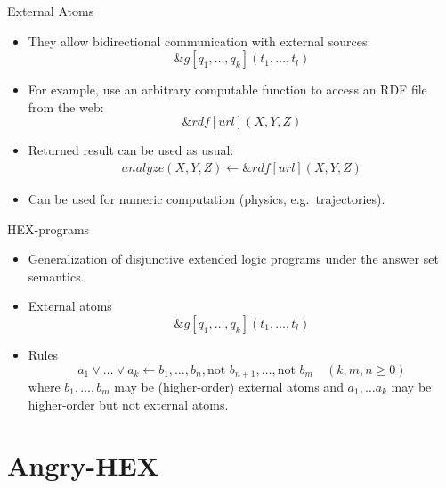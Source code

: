 \documentclass[smaller,dvipsnames]{beamer}
\newcommand{\ah}{Angry-HEX\xspace}
\begin{document}
\begin{frame}{External Atoms}
    \begin{itemize}[<+->]
    	\item They allow bidirectional communication with external sources: \[ \&g[q_1,\dots,q_k](t_1,\dots,t_l) \]
    	\item For example, use an arbitrary computable function to access an RDF file from the web: \[ \&rdf[url](X,Y,Z) \]
    	\item Returned result can be used as usual:
    		\begin{align*}
				analyze(X,Y,Z) \leftarrow \&rdf[url](X,Y,Z)
    		\end{align*}
    	\item Can be used for numeric computation (physics, e.g.~trajectories).
    \end{itemize}
\end{frame}

\begin{frame}{HEX-programs}
    \begin{itemize}[<+->]
    	\item Generalization of disjunctive extended logic programs under the answer set semantics.
    	\item External atoms \[ \&g[q_1,\dots,q_k](t_1,\dots,t_l) \]
    	\item Rules \[ a_1 \lor \dots \lor a_k \leftarrow b_1, \dots , b_n, \text{not } b_{n+1}, \dots, \text{not } b_m \quad (k,m,n \geq 0)\] where \(b_1, \dots, b_m\) may be (higher-order) external atoms and \(a_1, \ldots a_k\) may be higher-order but not external atoms. 
    \end{itemize}
\end{frame}

\section{\ah}
\end{document}
